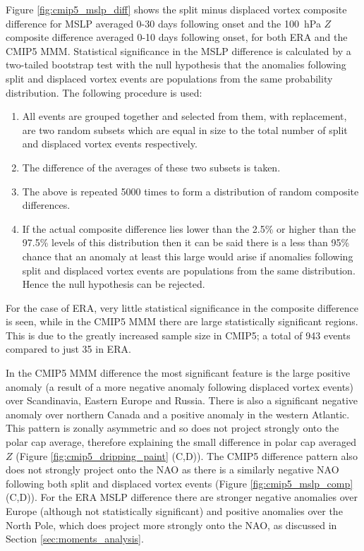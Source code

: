 \bigskip Figure \ref{fig:cmip5_mslp_diff} shows the split minus displaced vortex
composite difference for MSLP averaged 0-30 days following onset and the 100~hPa
$Z$ composite difference averaged 0-10 days following onset, for both ERA and
the CMIP5 MMM. Statistical significance in the MSLP difference is calculated by
a two-tailed bootstrap test with the null hypothesis that the anomalies
following split and displaced vortex events are populations from the same
probability distribution. The following procedure is used:
\begin{enumerate}
\item All events are grouped together and selected from them, with replacement,
  are two random subsets which are equal in size to the total number of split
  and displaced vortex events respectively.
\item The difference of the averages of these two subsets is taken.
\item The above is repeated 5000 times to form a distribution of random
  composite differences.
\item If the actual composite difference lies lower than the 2.5\% or higher
  than the 97.5\% levels of this distribution then it can be said there is a
  less than 95\% chance that an anomaly at least this large would arise if
  anomalies following split and displaced vortex events are populations from the
  same distribution. Hence the null hypothesis can be rejected.
\end{enumerate}
For the case of ERA, very little statistical significance in the
composite difference is seen, while in the CMIP5 MMM there are large
statistically significant regions. This is due to the greatly increased sample
size in CMIP5; a total of 943 events compared to just 35 in ERA. 

In the CMIP5 MMM difference the most significant feature is the large positive
anomaly (a result of a more negative anomaly following displaced vortex events)
over Scandinavia, Eastern Europe and Russia. There is also a significant
negative anomaly over northern Canada and a positive anomaly in the western
Atlantic. This pattern is zonally asymmetric and so does not project strongly
onto the polar cap average, therefore explaining the small difference in polar
cap averaged $Z$ (Figure \ref{fig:cmip5_dripping_paint} (C,D)). The CMIP5
difference pattern also does not strongly project onto the NAO as there is a
similarly negative NAO following both split and displaced vortex events (Figure
\ref{fig:cmip5_mslp_comp} (C,D)). For the ERA MSLP difference there are stronger
negative anomalies over Europe (although not statistically significant) and
positive anomalies over the North Pole, which does project more strongly onto
the NAO, as discussed in Section \ref{sec:moments_analysis}.


